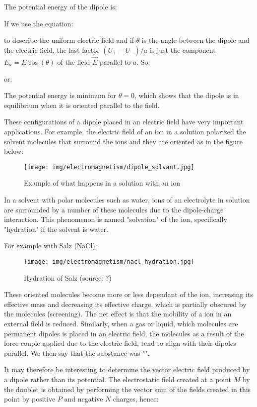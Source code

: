 	The potential energy of the dipole is:
	
	If we use the equation:
	
	to describe the uniform electric field and if $\theta$ is the angle between the dipole and the electric field, the last factor $(U_+ - U_-)/a$ is just the component $E_a=E\cos(\theta)$ of the field $\vec{E}$ parallel to $a$. So:
	
	or:
	
	The potential energy is minimum for $\theta=0$, which shows that the dipole is in equilibrium when it is oriented parallel to the field.

	These configurations of a dipole placed in an electric field have very important applications. For example, the electric field of an ion in a solution polarized the solvent molecules that surround the ions and they are oriented as in the figure below:
	\begin{figure}[H]
		\centering
		\texttt{[image: img/electromagnetism/dipole\_solvant.jpg]}
		\caption{Example of what happens in a solution with an ion}
	\end{figure}
	In a solvent with polar molecules such as water, ions of an electrolyte in solution are surrounded by a number of these molecules due to the dipole-charge interaction. This phenomenon is named "solvation" of the ion, specifically "hydration" if the solvent is water.
	
	For example with Salz (NaCl):
	\begin{figure}[H]
		\centering
		\texttt{[image: img/electromagnetism/nacl\_hydration.jpg]}
		\caption{Hydration of Salz (source: ?)}
	\end{figure}
	These oriented molecules become more or less dependant of the ion, increasing its effective mass and decreasing its effective charge, which is partially obscured by the molecules (screening). The net effect is that the mobility of a ion in an external field is reduced. Similarly, when a gas or liquid, which  molecules are permanent dipoles is placed in an electric field, the molecules as a result of the force couple applied due to the electric field, tend to align with their dipoles parallel. We then say that the substance was "".

	It may therefore be interesting to determine the vector electric field produced by a dipole rather than its potential. The electrostatic field created at a point $M$ by the doublet is obtained by performing the vector sum of the fields created in this point by positive $P$ and negative $N$ charges, hence:
	

